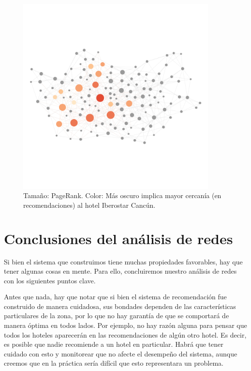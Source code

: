 \documentclass[12pt]{report}
\begin{document}
\begin{figure}[h!t]
	\includegraphics[width=0.9\textwidth, angle=0,
		trim = 100 900 100 900, clip]{imagenes/cancun_iberostar2.png}
	\caption{\label{fig:cancun_iberostar} Tamaño: PageRank. Color: Más oscuro implica mayor cercanía (en recomendaciones) al hotel Iberostar Cancún.}
\end{figure}

\clearpage
\section{Conclusiones del análisis de redes}

Si bien el sistema que construimos tiene muchas propiedades favorables, hay que tener algunas cosas en mente. Para ello, concluiremos nuestro análisis de redes con los siguientes puntos clave.

Antes que nada, hay que notar que si bien el sistema de recomendación fue construido de manera cuidadosa, sus bondades dependen de las características particulares de la zona, por lo que no hay garantía de que se comportará de manera óptima en todos lados. Por ejemplo, no hay razón alguna para pensar que todos los hoteles aparecerán en las recomendaciones de algún otro hotel. Es decir, es posible que nadie recomiende a un hotel en particular. Habrá que tener cuidado con esto y monitorear que no afecte el desempeño del sistema, aunque creemos que en la práctica sería difícil que esto representara un problema.
\end{document}
